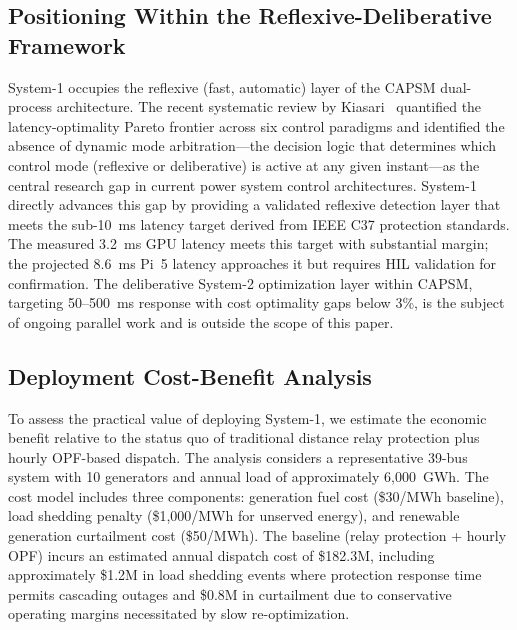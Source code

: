 \documentclass[journal]{IEEEtran}
\begin{document}
\subsection{Positioning Within the Reflexive-Deliberative Framework}

System-1 occupies the reflexive (fast, automatic) layer of the CAPSM dual-process architecture. The recent systematic review by Kiasari~\cite{ref_litreview} quantified the latency-optimality Pareto frontier across six control paradigms and identified the absence of dynamic mode arbitration---the decision logic that determines which control mode (reflexive or deliberative) is active at any given instant---as the central research gap in current power system control architectures. System-1 directly advances this gap by providing a validated reflexive detection layer that meets the sub-10~ms latency target derived from IEEE C37 protection standards. The measured 3.2~ms GPU latency meets this target with substantial margin; the projected 8.6~ms Pi~5 latency approaches it but requires HIL validation for confirmation. The deliberative System-2 optimization layer within CAPSM, targeting 50--500~ms response with cost optimality gaps below 3\%, is the subject of ongoing parallel work and is outside the scope of this paper.


\subsection{Deployment Cost-Benefit Analysis}

To assess the practical value of deploying System-1, we estimate the economic benefit relative to the status quo of traditional distance relay protection plus hourly OPF-based dispatch. The analysis considers a representative 39-bus system with 10 generators and annual load of approximately 6,000~GWh. The cost model includes three components: generation fuel cost (\$30/MWh baseline), load shedding penalty (\$1,000/MWh for unserved energy), and renewable generation curtailment cost (\$50/MWh). The baseline (relay protection + hourly OPF) incurs an estimated annual dispatch cost of \$182.3M, including approximately \$1.2M in load shedding events where protection response time permits cascading outages and \$0.8M in curtailment due to conservative operating margins necessitated by slow re-optimization.
\end{document}
